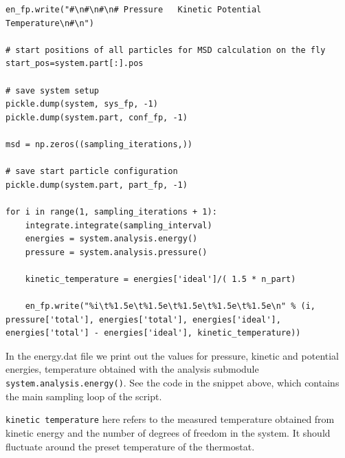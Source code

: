 \documentclass[
paper=a4,                       %
fontsize=11pt,                  %
twoside,                        %
footsepline,                    %
headsepline,                    %
headinclude=false,              %
footinclude=false,              %
pagesize,                       %
]{scrartcl}
\newtheorem{task}{Task}
\begin{document}
{\begin{lstlisting}
en_fp.write("#\n#\n#\n# Pressure   Kinetic Potential   Temperature\n#\n")

# start positions of all particles for MSD calculation on the fly
start_pos=system.part[:].pos

# save system setup
pickle.dump(system, sys_fp, -1)
pickle.dump(system.part, conf_fp, -1)

msd = np.zeros((sampling_iterations,))

# save start particle configuration
pickle.dump(system.part, part_fp, -1)

for i in range(1, sampling_iterations + 1):
    integrate.integrate(sampling_interval)
    energies = system.analysis.energy()
    pressure = system.analysis.pressure()

    kinetic_temperature = energies['ideal']/( 1.5 * n_part)

    en_fp.write("%i\t%1.5e\t%1.5e\t%1.5e\t%1.5e\t%1.5e\n" % (i, pressure['total'], energies['total'], energies['ideal'], energies['total'] - energies['ideal'], kinetic_temperature))
\end{lstlisting}}\vspace{0,2cm}

In the energy.dat file we print out the values for pressure, kinetic
and potential energies, temperature obtained with the analysis submodule
\lstinline|system.analysis.energy()|. See the code in the snippet above, which
contains the main sampling loop of the script.

\noindent \texttt{kinetic temperature} here refers to the measured temperature
obtained from kinetic energy and the number of degrees of freedom in the system. It
should fluctuate around the preset temperature of the thermostat.

\newpage
\vspace{1cm}\vspace{1cm}
\end{document}

